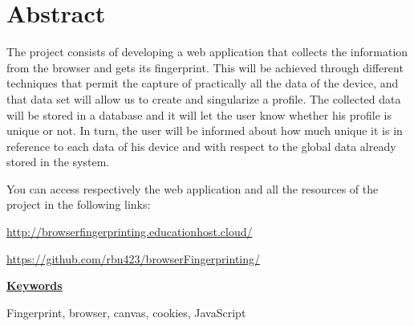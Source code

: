 \chapter*{Abstract}

The project consists of developing a web application that collects the information from the browser and gets its fingerprint. This will be achieved through different techniques that permit the capture of practically all the data of the device, and that data set will allow us to create and singularize a profile. The collected data will be stored in a database and it will let the user know whether his profile is unique or not. In turn, the user will be informed about how much unique it is in reference to each data of his device and with respect to the global data already stored in the system. \par

\noindent
You can access respectively the web application and all the resources of the project in the following links: \par
\url{http://browserfingerprinting.educationhost.cloud/} \par

\url{https://github.com/rbn423/browserFingerprinting/} \par
\vspace{12mm}
\noindent
\underline{\Large{\textbf{Keywords}}}\par
\vspace{7mm}
\noindent
\normalsize{Fingerprint, browser, canvas, cookies, JavaScript}